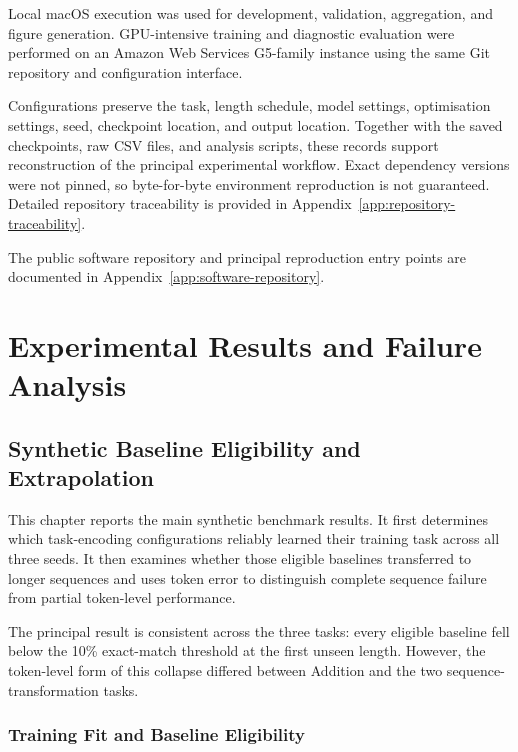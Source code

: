 \documentclass[
    author={Aanchala Ravindra Bhongade},
    supervisor={Dr. Fernando Moreno-Pino},
    degree={MSc},
    title={Length Generalisation in Transformer-Based Sequence Models: Failure Taxonomy and Mitigation Strategies},
    subtitle={},
    type={},
    year={2026}
]{dissertation}
\begin{document}
Local macOS execution was used for development, validation, aggregation, and figure generation. GPU-intensive training and diagnostic evaluation were performed on an Amazon Web Services G5-family instance using the same Git repository and configuration interface.

Configurations preserve the task, length schedule, model settings,
optimisation settings, seed, checkpoint location, and output location. Together with the saved checkpoints, raw CSV files, and analysis scripts, these records support reconstruction of the principal experimental workflow. Exact dependency versions were not pinned, so byte-for-byte environment reproduction is not guaranteed. Detailed repository traceability is provided in Appendix~\ref{app:repository-traceability}.

The public software repository and principal reproduction entry points are documented in Appendix~\ref{app:software-repository}.




\chapter{Experimental Results and Failure Analysis}
\label{chap:results-analysis}

\section{Synthetic Baseline Eligibility and Extrapolation}
\label{sec:synthetic-results}

\noindent
This chapter reports the main synthetic benchmark results. It first determines which task-encoding configurations reliably learned their training task across all three seeds. It then examines whether those eligible baselines transferred to longer sequences and uses token error to distinguish complete sequence failure from partial token-level performance.

The principal result is consistent across the three tasks: every eligible baseline fell below the 10\% exact-match threshold at the first unseen length. However, the token-level form of this collapse differed between Addition and the two sequence-transformation tasks.

\subsection{Training Fit and Baseline Eligibility}
\label{sec:baseline-results}
\end{document}

